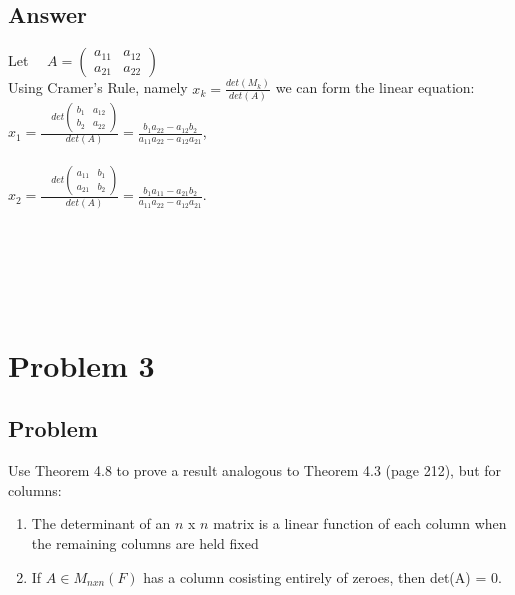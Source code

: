 \documentclass{article}
\begin{document}
\subsection*{Answer}
Let \(\quad A = \begin{pmatrix} a_{11} & a_{12} \\ a_{21} & a_{22} \end{pmatrix}\)
\\ Using Cramer's Rule, namely \(x_{k} = \frac{det(M_{k})}{det(A)}\) we can form the linear equation:
\\ \(x_{1} =\frac{\quad det\begin{pmatrix} b_{1} & a_{12} \\ b_{2} & a_{22}\end{pmatrix}}{\quad det(A)} = \frac{b_{1}a_{22} 
- a_{12}b_{2}}{a_{11}a_{22}-a_{12}a_{21}}\),
\\
\\ \(x_{2} =\frac{\quad det\begin{pmatrix} a_{11} & b_{1} \\ a_{21} & b_{2}\end{pmatrix}}{\quad det(A)} = \frac{b_{1}a_{11} 
- a_{21}b_{2}}{a_{11}a_{22}-a_{12}a_{21}}\).
\\\\\\\\\\\\
\section*{Problem 3}
\subsection*{Problem}
Use Theorem 4.8 to prove a result analogous to Theorem 4.3 (page 212), but for columns:
\\ \begin{enumerate}[label=(\alph{*})]
	\item The determinant of an \(n\) x \(n\) matrix is a linear function of each column when the remaining columns are held fixed
	\item If \(A \in M_{nxn}(F)\) has a column cosisting entirely of zeroes, then det(A) = 0.
\end{enumerate}
\end{document}
